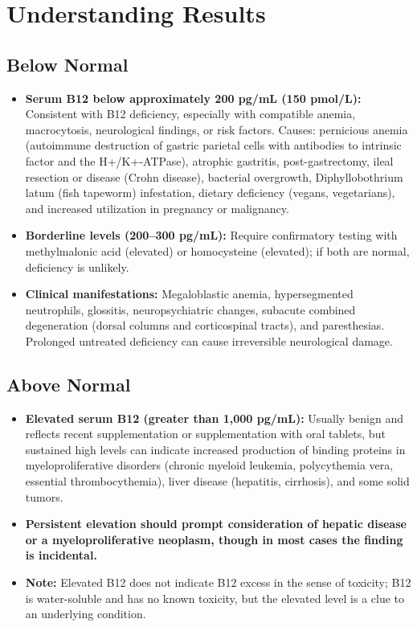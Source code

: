 \section*{Understanding Results}

\subsection*{Below Normal}
\begin{itemize}
  \item \textbf{Serum B12 below approximately 200 pg/mL (150 pmol/L):} Consistent with B12 deficiency, especially with compatible anemia, macrocytosis, neurological findings, or risk factors. Causes: pernicious anemia (autoimmune destruction of gastric parietal cells with antibodies to intrinsic factor and the H+/K+-ATPase), atrophic gastritis, post-gastrectomy, ileal resection or disease (Crohn disease), bacterial overgrowth, Diphyllobothrium latum (fish tapeworm) infestation, dietary deficiency (vegans, vegetarians), and increased utilization in pregnancy or malignancy.
  \item \textbf{Borderline levels (200--300 pg/mL):} Require confirmatory testing with methylmalonic acid (elevated) or homocysteine (elevated); if both are normal, deficiency is unlikely.
  \item \textbf{Clinical manifestations:} Megaloblastic anemia, hypersegmented neutrophils, glossitis, neuropsychiatric changes, subacute combined degeneration (dorsal columns and corticospinal tracts), and paresthesias. Prolonged untreated deficiency can cause irreversible neurological damage.
\end{itemize}

\subsection*{Above Normal}
\begin{itemize}
  \item \textbf{Elevated serum B12 (greater than 1,000 pg/mL):} Usually benign and reflects recent supplementation or supplementation with oral tablets, but sustained high levels can indicate increased production of binding proteins in myeloproliferative disorders (chronic myeloid leukemia, polycythemia vera, essential thrombocythemia), liver disease (hepatitis, cirrhosis), and some solid tumors.
  \item \textbf{Persistent elevation should prompt consideration of hepatic disease or a myeloproliferative neoplasm, though in most cases the finding is incidental.}
  \item \textbf{Note:} Elevated B12 does not indicate B12 excess in the sense of toxicity; B12 is water-soluble and has no known toxicity, but the elevated level is a clue to an underlying condition.
\end{itemize}

